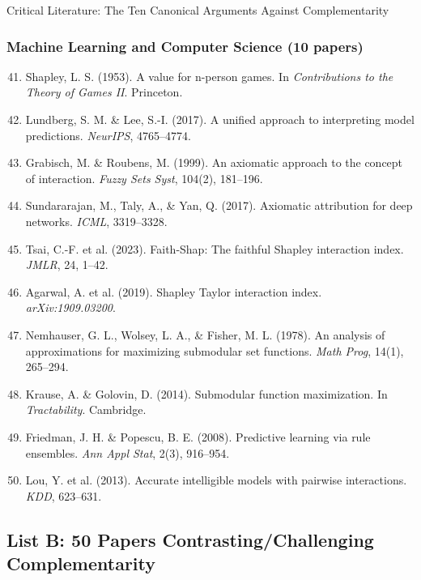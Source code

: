 \begin{chapter}{Critical Literature: The Ten Canonical Arguments Against Complementarity}
\subsubsection{Machine Learning and Computer Science (10 papers)}

\begin{enumerate}
    \setcounter{enumi}{40}
    \item Shapley, L. S. (1953). A value for n-person games. In \textit{Contributions to the Theory of Games II}. Princeton.

    \item Lundberg, S. M. \& Lee, S.-I. (2017). A unified approach to interpreting model predictions. \textit{NeurIPS}, 4765--4774.

    \item Grabisch, M. \& Roubens, M. (1999). An axiomatic approach to the concept of interaction. \textit{Fuzzy Sets Syst}, 104(2), 181--196.

    \item Sundararajan, M., Taly, A., \& Yan, Q. (2017). Axiomatic attribution for deep networks. \textit{ICML}, 3319--3328.

    \item Tsai, C.-F. et al. (2023). Faith-Shap: The faithful Shapley interaction index. \textit{JMLR}, 24, 1--42.

    \item Agarwal, A. et al. (2019). Shapley Taylor interaction index. \textit{arXiv:1909.03200}.

    \item Nemhauser, G. L., Wolsey, L. A., \& Fisher, M. L. (1978). An analysis of approximations for maximizing submodular set functions. \textit{Math Prog}, 14(1), 265--294.

    \item Krause, A. \& Golovin, D. (2014). Submodular function maximization. In \textit{Tractability}. Cambridge.

    \item Friedman, J. H. \& Popescu, B. E. (2008). Predictive learning via rule ensembles. \textit{Ann Appl Stat}, 2(3), 916--954.

    \item Lou, Y. et al. (2013). Accurate intelligible models with pairwise interactions. \textit{KDD}, 623--631.
\end{enumerate}

\subsection{List B: 50 Papers Contrasting/Challenging Complementarity}


\end{chapter}

